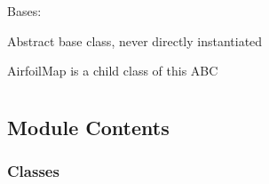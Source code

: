 \documentclass[letterpaper,10pt,english]{sphinxmanual}
\begin{document}
\begin{fulllineitems}
\label{\detokenize{autoapi/Grid/index:Grid.Grid}}
\sphinxAtStartPar
Bases: 

\sphinxAtStartPar
Abstract base class, never directly instantiated

\sphinxAtStartPar
AirfoilMap is a child class of this ABC

\begin{fulllineitems}
\label{\detokenize{autoapi/Grid/index:Grid.Grid.get_size}}
\end{fulllineitems}


\begin{fulllineitems}
\label{\detokenize{autoapi/Grid/index:Grid.Grid.get_geometry}}
\end{fulllineitems}


\end{fulllineitems}



\section{}
\label{\detokenize{autoapi/ImplicitEuler/index:module-ImplicitEuler}}\label{\detokenize{autoapi/ImplicitEuler/index:impliciteuler}}\label{\detokenize{autoapi/ImplicitEuler/index::doc}}

\subsection{Module Contents}
\label{\detokenize{autoapi/ImplicitEuler/index:module-contents}}

\subsubsection{Classes}
\label{\detokenize{autoapi/ImplicitEuler/index:classes}}
\end{document}
